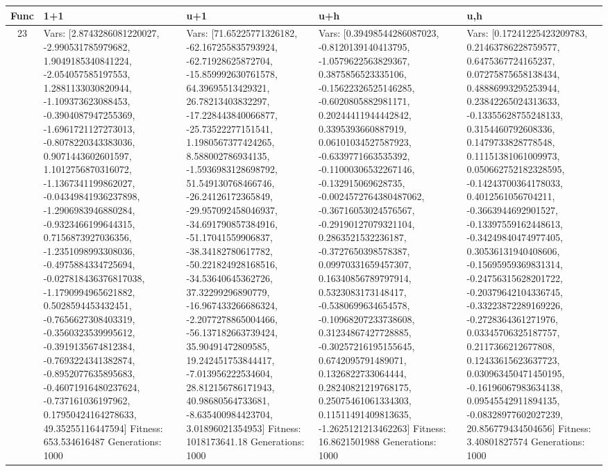 \documentclass[landscape,11pt]{article}
\begin{document}
\newpage
\begin{tabular}{|c|p{5.4cm}|p{5.4cm}|p{5.4cm}|p{5.4cm}|}
\hline
Func & 1+1 & u+1 & u+h & u,h \\ 
\hline 23 & Vars: [2.8743286081220027, -2.990531785979682, 1.9049185340841224, -2.054057585197553, 1.2881133030820944, -1.109373623088453, -0.3904087947255369, -1.6961721127273013, -0.8078220343383036, 0.9071443602601597, 1.1012756870316072, -1.1367341199862027, -0.04349841936237898, -1.2906983946880284, -0.9323466199644315, 0.7156873927036356, -1.2351098993308036, -0.4975884334725694, -0.027818436376817038, -1.1790994965621882, 0.5028594453432451, -0.7656627308403319, -0.3560323539995612, -0.3919135674812384, -0.7693224341382874, -0.8952077635895683, -0.46071916480237624, -0.737161036197962, 0.17950424164278633, 49.35255116447594] Fitness: 653.534616487 Generations: 1000 & Vars: [71.65225771326182, -62.167255835793924, -62.71928625872704, -15.859992630761578, 64.39695513429321, 26.78213403832297, -17.228443840066877, -25.73522277151541, 1.1980567377424265, 8.588002786934135, -1.5936983128698792, 51.549130768466746, -26.24126172365849, -29.957092458046937, -34.691790857384916, -51.17041559906837, -38.34182780617782, -50.221824928168516, -34.53640645362726, 37.32299296890779, -16.967433266686324, -2.2077278865004466, -56.137182663739424, 35.90491472809585, 19.242451753844417, -7.013956222534604, 28.812156786171943, 40.98680564733681, -8.635400984423704, 3.01896021354953] Fitness: 1018173641.18 Generations: 1000 & Vars: [0.39498544286087023, -0.8120139140413795, -1.0579622563829367, 0.3875856523335106, -0.15622326525146285, -0.6020805882981171, 0.20244411944442842, 0.3395393660887919, 0.06101034527587923, -0.6339771663535392, -0.11000306532267146, -0.132915069628735, -0.0024572764380487062, -0.36716053024576567, -0.29190127079321104, 0.2863521532236187, -0.3727650398578387, 0.09970331659457307, 0.16340856789797914, 0.5323083173148417, -0.5380699634654578, -0.10968207233738608, 0.31234867427728885, -0.30257216195155645, 0.6742095791489071, 0.1326822733064444, 0.28240821219768175, 0.25075461061334303, 0.11511491409813635, -1.2625121213462263] Fitness: 16.8621501988 Generations: 1000 & Vars: [0.17241225423209783, 0.21463786228759577, 0.6475367724165237, 0.07275875658138434, 0.48886993295253944, 0.23842265024313633, -0.13355628755248133, 0.3154460792608336, 0.1479733828778548, 0.11151381061009973, 0.050662752182328595, -0.14243700364178033, 0.4012561056704211, -0.3663944692901527, -0.13397559162448613, -0.34249840474977405, 0.30536131940408606, -0.15695959369831314, -0.24756315628201722, -0.20379642104336745, -0.33223872289169226, -0.2728364361271976, 0.03345706325187757, 0.2117366212677808, 0.12433615623637723, 0.030963450471450195, -0.16196067983634138, 0.09545542911894135, -0.08328977602027239, 20.856779434504656] Fitness: 3.40801827574 Generations: 1000 \\
 \hline 
\end{tabular}
\end{document}
